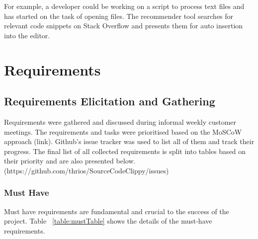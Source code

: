 \documentclass{l4proj}
\begin{document}
For example, a developer could be working on a script to process text files and has started on the task of opening files. The recommender tool searches for relevant code snippets on Stack Overflow and presents them for auto insertion into the editor. 

\chapter{Requirements}

\section{Requirements Elicitation and Gathering}
Requirements were gathered and discussed during informal weekly customer meetings.
The requirements and tasks were prioritised based on the MoSCoW approach (link). Github's issue tracker was used to list all of them and track their progress. The final list of all collected requirements is split into tables based on their priority and are also presented below.   (https://github.com/thrios/SourceCodeClippy/issues)

\subsection{Must Have}
Must have requirements are fundamental and crucial to the success of the project. Table ~\ref{table:mustTable} shows the details of the must-have requirements.
\end{document}
